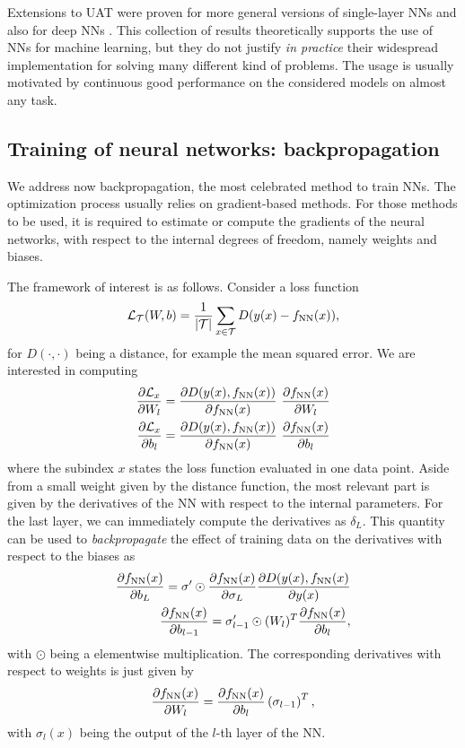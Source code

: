 \documentclass[]{report}
\begin{document}
Extensions to UAT were proven for more general versions of single-layer NNs and also for deep NNs \cite{hornik1991approximation}. This collection of results theoretically supports the use of NNs for machine learning, but they do not justify \textit{in practice} their widespread implementation for solving many different kind of problems. The usage is usually motivated by continuous good performance on the considered models on almost any task. 

\subsection{Training of neural networks: backpropagation}

We address now backpropagation, the most celebrated method to train NNs. The optimization process usually relies on gradient-based methods. For those methods to be used, it is required to estimate or compute the gradients of the neural networks, with respect to the internal degrees of freedom, namely weights and biases. 

The framework of interest is as follows. Consider a loss function
\begin{equation}
\mathcal L_{\mathcal T}(W, b)= \frac{1}{\vert \mathcal T \vert} \sum_{x \in \mathcal T} D(y(x) - f_{\rm NN}(x)), 
\end{equation}
for $D(\cdot, \cdot)$ being a distance, for example the mean squared error. We are interested in computing
\begin{align}
\frac{\partial \mathcal L_x}{\partial W_l} = \frac{\partial D(y(x), f_{\rm NN}(x))}{\partial f_{\rm NN}(x)} \ \frac{\partial f_{\rm NN}(x)}{\partial W_l}\\
\frac{\partial \mathcal L_x}{\partial b_l} = \frac{\partial D(y(x), f_{\rm NN}(x))}{\partial f_{\rm NN}(x)} \ \frac{\partial f_{\rm NN}(x)}{\partial b_l}\\
\end{align}
where the subindex $x$ states the loss function evaluated in one data point. Aside from a small weight given by the distance function, the most relevant part is given by the derivatives of the NN with respect to the internal parameters. For the last layer, we can immediately compute the derivatives as $\delta_L$. This quantity can be used to \textit{backpropagate} the effect of training data on the derivatives with respect to the biases as
\begin{align}
\frac{\partial f_{\rm NN}(x)}{\partial b_L} = \sigma^\prime \odot \frac{\partial f_{\rm NN}(x)}{\partial \sigma_L} \frac{\partial D(y(x), f_{\rm NN}(x)}{\partial y(x)} \\
\frac{\partial f_{\rm NN}(x)}{\partial b_{l - 1}} = \sigma_{l - 1}^\prime \odot (W_l)^T \frac{\partial f_{\rm NN}(x)}{\partial b_l}, 
\end{align}
with $\odot$ being a elementwise multiplication.
The corresponding derivatives with respect to weights is just given by
\begin{equation}
\frac{\partial f_{\rm NN}(x)}{\partial W_l} = \frac{\partial f_{\rm NN}(x)}{\partial b_l} \left(\sigma_{l - 1}\right)^T,
\end{equation}
with $\sigma_l(x)$ being the output of the $l$-th layer of the NN. 
\end{document}
